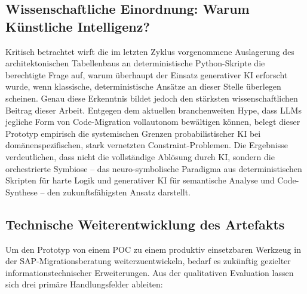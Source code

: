 \subsection{Wissenschaftliche Einordnung: Warum Künstliche Intelligenz?}
Kritisch betrachtet wirft die im letzten Zyklus vorgenommene Auslagerung des architektonischen Tabellenbaus an deterministische Python-Skripte die berechtigte Frage auf, warum überhaupt der Einsatz generativer \ac{KI} erforscht wurde, wenn klassische, deterministische Ansätze an dieser Stelle überlegen scheinen. Genau diese Erkenntnis bildet jedoch den stärksten wissenschaftlichen Beitrag dieser Arbeit. Entgegen dem aktuellen branchenweiten Hype, dass \ac{LLMs} jegliche Form von Code-Migration vollautonom bewältigen können, belegt dieser Prototyp empirisch die systemischen Grenzen probabilistischer \ac{KI} bei domänenspezifischen, stark vernetzten Constraint-Problemen. Die Ergebnisse verdeutlichen, dass nicht die vollständige Ablösung durch \ac{KI}, sondern die orchestrierte Symbiose – das neuro-symbolische Paradigma aus deterministischen Skripten für harte Logik und generativer \ac{KI} für semantische Analyse und Code-Synthese – den zukunftsfähigsten Ansatz darstellt.

\subsection{Technische Weiterentwicklung des Artefakts}
Um den Prototyp von einem \ac{POC} zu einem produktiv einsetzbaren Werkzeug in der SAP-Migrationsberatung weiterzuentwickeln, bedarf es zukünftig gezielter informationstechnischer Erweiterungen. Aus der qualitativen Evaluation lassen sich drei primäre Handlungsfelder ableiten:

